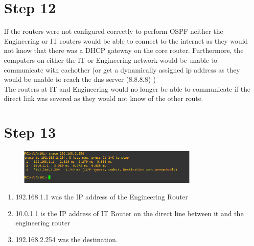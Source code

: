 \documentclass{article}
\begin{document}
	\section{Step 12}
		If the routers were not configured correctly to perform OSPF neither the Engineering or IT routers would be able to connect to the internet as they would not know that there was a DHCP gateway on the core router. Furthermore, the computers on either the IT or Engineering network would be unable to communicate with eachother (or get a dynamically assigned ip address as they would be unable to reach the dns server (8.8.8.8) )\\
		The routers at IT and Engineering would no longer be able to communicate if the direct link was severed as they would not know of the other route.
	\section{Step 13}
		\begin{figure}[h!]
			\centering
			\includegraphics[width=0.8\textwidth]{step_13_trace}
		\end{figure}
		\begin{enumerate}
			\item 192.168.1.1 was the IP address of the Engineering Router
			\item 10.0.1.1 is the IP address of IT Router on the direct line between it and the engineering router
			\item 192.168.2.254 was the destination.
		\end{enumerate}
		\newpage
\end{document}
